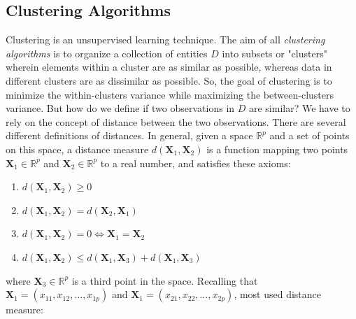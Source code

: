 
\subsection{Clustering Algorithms}
\label{sec:clustering}
Clustering is an unsupervised learning technique. The aim of all \emph{clustering algorithms} is to organize a collection of entities $D$ into subsets or "clusters" wherein elements within a cluster are as similar as possible, whereas data in different clusters are as dissimilar as possible. So, the goal of clustering is to minimize the within-clusters variance while maximizing the between-clusters variance. But how do we define if two observations in $D$ are similar? We have to rely on the concept of distance between the two observations. There are several different definitions of distances. In general, given a space $\mathbb{R}^p$ and a set of points on this space, a distance measure $d\left(\mathbf{X}_1,\mathbf{X}_2\right)$ is a function mapping two points $\mathbf{X}_1\in\mathbb{R}^p$ and $\mathbf{X}_2\in\mathbb{R}^p$ to a real number, and satisfies these axioms:
\begin{enumerate}
    \item $d\left(\mathbf{X}_1,\mathbf{X}_2\right) \geq 0$
    \item $d\left(\mathbf{X}_1,\mathbf{X}_2\right) = d\left(\mathbf{X}_2,\mathbf{X}_1\right)$
    \item $d\left(\mathbf{X}_1,\mathbf{X}_2\right)=0 \Leftrightarrow \mathbf{X}_1 = \mathbf{X}_2$
    \item $d\left(\mathbf{X}_1,\mathbf{X}_2\right) \leq d\left(\mathbf{X}_1,\mathbf{X}_3\right) + d\left(\mathbf{X}_1,\mathbf{X}_3\right)$
\end{enumerate}
where $\mathbf{X}_3 \in \mathbb{R}^p$ is a third point in the space. Recalling that $\mathbf{X}_1=\left(x_{11}, x_{12}, \dots, x_{1p} \right)$ and $\mathbf{X}_1=\left(x_{21}, x_{22}, \dots, x_{2p} \right)$, most used distance measure:
